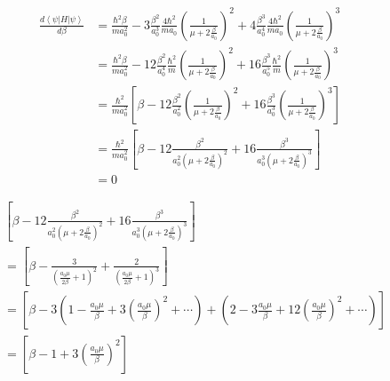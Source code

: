 \documentclass[12pt]{article}
\begin{document}
\begin{equation*}
    \begin{split}
        \frac{d\left\langle \psi \left| H \right| \psi\right\rangle}{d\beta} & =
        \frac{\hbar^2 \beta}{m a_0^2} - 3 \frac{\beta^2}{a_0^3} \frac{4 \hbar^2}{m a_0}\left(\frac{1}{\mu+2\frac{\beta}{a_0}}\right)^2 + 4 \frac{\beta^3}{a_0^4} \frac{4 \hbar^2}{m a_0}\left(\frac{1}{\mu+2\frac{\beta}{a_0}}\right)^3                                                                \\
                                                                             & = \frac{\hbar^2 \beta}{m a_0^2} - 12 \frac{\beta^2}{a_0^4} \frac{\hbar^2}{m}\left(\frac{1}{\mu+2\frac{\beta}{a_0}}\right)^2 + 16 \frac{\beta^3}{a_0^5} \frac{\hbar^2}{m}\left(\frac{1}{\mu+2\frac{\beta}{a_0}}\right)^3 \\
                                                                             & = \frac{\hbar^2}{m a_0^2} \left[\beta - 12 \frac{\beta^2}{a_0^2}\left(\frac{1}{\mu+2\frac{\beta}{a_0}}\right)^2 + 16 \frac{\beta^3}{a_0^3}\left(\frac{1}{\mu+2\frac{\beta}{a_0}}\right)^3 \right]                       \\
                                                                             & = \frac{\hbar^2}{m a_0^2} \left[ \beta - 12 \frac{\beta^2}{a_0^2({\mu+2\frac{\beta}{a_0}})^2} + 16 \frac{\beta^3}{a_0^3({\mu+2\frac{\beta}{a_0}})^3} \right]                                                            \\
                                                                             & = 0
    \end{split}
\end{equation*}

\begin{equation*}
    \begin{split}
         &
        \left[ \beta - 12 \frac{\beta^2}{a_0^2({\mu+2\frac{\beta}{a_0}})^2} + 16 \frac{\beta^3}{a_0^3({\mu+2\frac{\beta}{a_0}})^3} \right]                                                   \\
         & =
        \left[ \beta -  \frac{3}{(\frac{a_0\mu}{2\beta}+1)^2} + \frac{2}{(\frac{a_0\mu}{2\beta}+1)^3} \right]                                                                                \\
         & =
        \left[ \beta - 3 \left(1- \frac{a_0\mu}{\beta} + 3 (\frac{a_0\mu}{\beta})^2 + \cdots \right) + \left(2- 3\frac{a_0\mu}{\beta} + 12 (\frac{a_0\mu}{\beta})^2 + \cdots \right) \right] \\
         & =
        \left[ \beta - 1 + 3 (\frac{a_0\mu}{\beta})^2 \right]
    \end{split}
\end{equation*}
\end{document}
